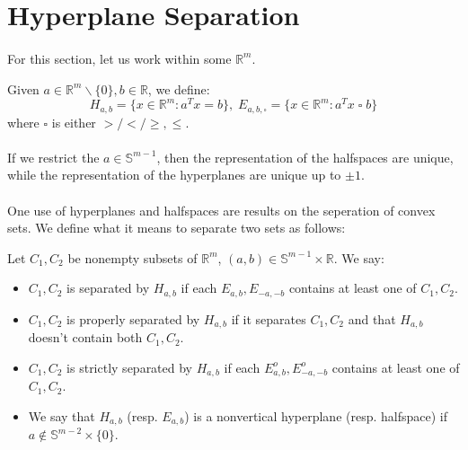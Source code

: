 \section{Hyperplane Separation}
\label{sect:014}
\paragraph{}For this section, let us work within some $\mathbb{R}^m$.

\begin{defn}\label{defn:014-hyperplanes-halfspaces}
	Given $a\in \mathbb{R}^{m}\smallsetminus \{0\},b\in \mathbb{R}$, we define:
	\[
		H_{a,b}=\{x\in \mathbb{R}^m:a^Tx=b\},\;
		E_{a,b,\square}=\{x\in \mathbb{R}^m:a^Tx\;\square \;b\}
	\]
	where $\square$ is either $>/</\geq,\leq$.
\end{defn}
\paragraph{}If we restrict the $a\in \mathbb{S}^{m-1}$, then the representation of the halfspaces are unique, while the representation of the hyperplanes are unique up to $\pm1$.


\paragraph{}One use of hyperplanes and halfspaces are results on the seperation of convex sets. We define what it means to separate two sets as follows:
\begin{defn}[Separation]\label{defn:014-hyperplane-sep}
	Let $C_1,C_2$ be nonempty subsets of $\mathbb{R}^m$, $(a,b)\in \mathbb{S}^{m-1}\times \mathbb{R}$. We say:
	\begin{itemize}
		\item $C_1,C_2$ is separated by $H_{a,b}$ if each $E_{a,b},E_{-a,-b}$ contains at least one of $C_1,C_2$.
		\item $C_1,C_2$ is properly separated by $H_{a,b}$ if it separates $C_1,C_2$ and that $H_{a,b}$ doesn't contain both $C_1,C_2$.
		\item $C_1,C_2$ is strictly separated by $H_{a,b}$ if each $E^o_{a,b},E^o_{-a,-b}$ contains at least one of $C_1,C_2$.
		\item We say that $H_{a,b}$ (resp. $E_{a,b}$) is a nonvertical hyperplane (resp. halfspace) if $a\notin \mathbb{S}^{m-2}\times \{0\}$.
	\end{itemize}
\end{defn}

